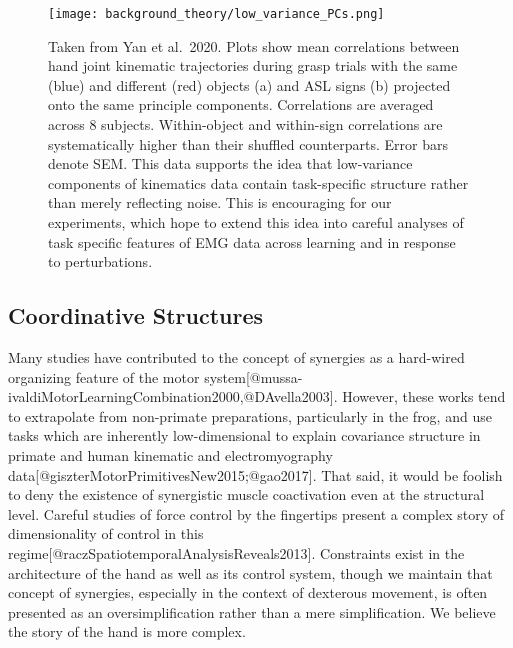 \documentclass[../main.tex]{subfiles}
\begin{document}
\begin{figure}[H]
\centering
  \texttt{[image: background\_theory/low\_variance\_PCs.png]}
  \caption[Low-variance PCs contain task-relevant information]{Taken from Yan et al.~2020. Plots show mean correlations between hand joint kinematic trajectories during grasp trials with the same (blue) and different (red) objects (a) and ASL signs (b) projected onto the same principle components. Correlations are averaged across 8 subjects. Within-object and within-sign correlations are systematically higher than their shuffled counterparts. Error bars denote SEM. This data supports the idea that low-variance components of kinematics data contain task-specific structure rather than merely reflecting noise. This is encouraging for our experiments, which hope to extend this idea into careful analyses of task specific features of EMG data across learning and in response to perturbations.}\label{fig:low_variance_PCs}
\end{figure}

\subsection{Coordinative Structures}\label{coordinative-structures}

Many studies have contributed to the concept of synergies as a hard-wired organizing feature of the motor system{[}@mussa-ivaldiMotorLearningCombination2000,@DAvella2003{]}. However, these works tend to extrapolate from non-primate preparations, particularly in the frog, and use tasks which are inherently low-dimensional to explain covariance structure in primate and human kinematic and electromyography data{[}@giszterMotorPrimitivesNew2015;@gao2017{]}. That said, it would be foolish to deny the existence of synergistic muscle coactivation even at the structural level. Careful studies of force control by the fingertips present a complex story of dimensionality of control in this regime{[}@raczSpatiotemporalAnalysisReveals2013{]}. Constraints exist in the architecture of the hand as well as its control system, though we maintain that concept of synergies, especially in the context of dexterous movement, is often presented as an oversimplification rather than a mere simplification. We believe the story of the hand is more complex.
\end{document}
